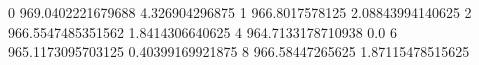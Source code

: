 0 969.0402221679688 4.326904296875
1 966.8017578125 2.08843994140625
2 966.5547485351562 1.8414306640625
4 964.7133178710938 0.0
6 965.1173095703125 0.40399169921875
8 966.58447265625 1.87115478515625
